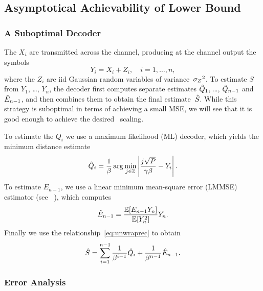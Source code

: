 \subsection{Asymptotical Achievability of Lower Bound}
\label{sec:achievable}

\subsubsection{A Suboptimal Decoder}

The $X_i$ are transmitted across the channel, producing at the channel output
the symbols
\begin{equation*}
  Y_i = X_i + Z_i, \quad i = 1, \dots, n,
\end{equation*}
where the $Z_i$ are iid Gaussian random variables of variance~${{\sigma_Z}^2}$. 
To estimate $S$ from  $Y_1$, \dots, $Y_n$, the decoder first
computes separate estimates $\hat{Q}_1$, \dots, $\hat{Q}_{n-1}$ and $\hat{E}_{n-1}$, and
then combines them to obtain the final estimate~${\hat{S}}$.  While this strategy is
suboptimal in terms of achieving a small MSE, we will see that it is good enough
to achieve the desired \sdr\ scaling.

To estimate the $Q_i$ we use a maximum likelihood (ML) decoder, which yields the
minimum distance estimate
\begin{equation}
  \label{eq:mldecoder}
  \hat{Q}_i = \frac{1}{\beta} \arg \min_{j\in \mathbb{Z}} \left| \frac{j\sqrt{P}}
  {\gamma\beta} - Y_i \right|.
\end{equation}
To estimate $E_{n-1}$, we use a linear minimum mean-square error (LMMSE)
estimator (see \eg~\cite[Section~8.3]{Scharf1990}), which computes
\begin{equation}
  \label{eq:lmmse}
  \hat{E}_{n-1} = \frac{\mathbb{E}[E_{n-1} Y_n]}{\mathbb{E}[Y_n^2]} Y_n.
\end{equation}
Finally we use the relationship~\eqref{eq:unwraprec} to obtain
\begin{equation}
  \label{eq:unwrapestim}
  {\hat{S}} = \sum_{i=1}^{n-1} \frac{1}{\beta^{i-1}} \hat{Q}_i + \frac{1}{\beta^{n-1}}
  \hat{E}_{n-1}.
\end{equation}


\subsubsection{Error Analysis}


